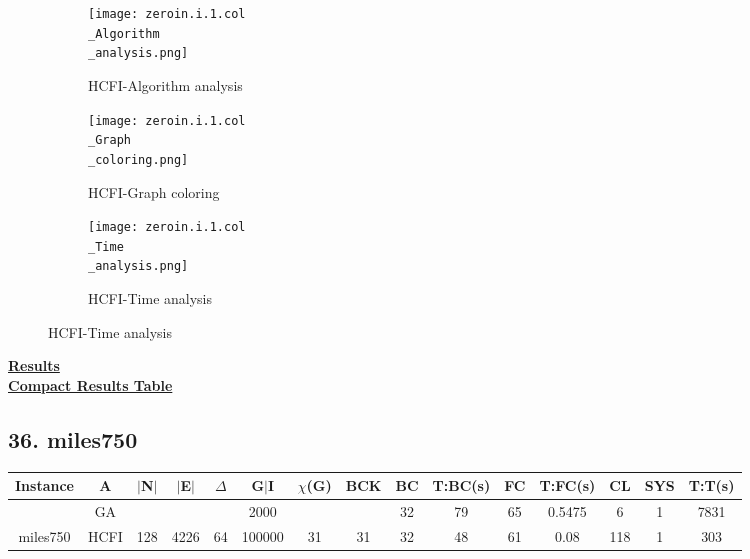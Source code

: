 \documentclass[10pt]{article}
\begin{document}
\graphicspath{{./Core1/Solutions/HCFI/zeroin.i.1.col}}
\begin{figure}[H]
\begin{subfigure}{.33\textwidth}
  \centering
  \texttt{[image: zeroin.i.1.col\\\_Algorithm\\\_analysis.png]}
  \caption{HCFI-Algorithm analysis}
   \label{fig:subfig1}
\end{subfigure}%
\begin{subfigure}{.33\textwidth}
  \centering
  \texttt{[image: zeroin.i.1.col\\\_Graph\\\_coloring.png]}
  \caption{HCFI-Graph coloring}
  \label{fig:subfig2}
\end{subfigure}
\begin{subfigure}{.33\textwidth}
  \centering
  \texttt{[image: zeroin.i.1.col\\\_Time\\\_analysis.png]}
  \caption{HCFI-Time analysis}
  \end{subfigure}
\end{figure}
\vspace{2cm}
\begin{center}
\hyperlink{page.8}{\textbf{Results}}\\
\vspace{0.5cm}
\hyperlink{page.71}{\textbf{Compact Results Table}}
\end{center}
\pagebreak\subsection*{\hspace{0,9073976cm} 36. miles750 }
\begin{table}[H]
\centering
\begin{tabular}{|c|c|c|c|c|c|c|c|c|c|c|c|c|c|c|}
\hline
Instance& A &$|$N$|$ & $|$E$|$ & $\Delta$ & G$|$I & $\chi$(G) &BCK&BC & T:BC(s) & FC & T:FC(s) & CL & SYS & T:T(s) \\ \hline \hline

	&GA&       &                   &                     &   2000      &     \cellcolor{yellow} & {\cellcolor{yellow}}& {{\cellcolor{green}32}}
&79   &65        &0.5475                    & 6                   &1          & 7831       \\ \cline{2-2} \cline{6-6} \cline{9-15}
 \multirow{-2}{*}{miles750} &HCFI   &\multirow{-2}{*}{128}   &\multirow{-2}{*}{4226}     &\multirow{-2}{*}{64}     &100000     &\multirow{-2}{*}{\cellcolor{yellow}31}      & \multirow{-2}{*}{\cellcolor{yellow}31}    &{\cellcolor{green}32}     &48         &61    &0.08         &   118 &1     & 303       \\ \hline 
\end{tabular}
\end{table}
\end{document}
